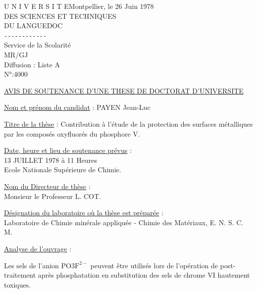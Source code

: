 
\noindent U N I V E R S I T E\hfill Montpellier, le 26 Juin 1978\\
DES SCIENCES ET TECHNIQUES\\
DU LANGUEDOC\\
\texttt{-{}-{}-{}-{}-{}-{}-{}-{}-{}-{}-{}-}\\
Service de la Scolarité\\
MR/GJ\\
Diffusion : Liste A\\
N°:4000

\uline{AVIS DE SOUTENANCE D'UNE THESE DE DOCTORAT D'UNIVERSITE}

\uline{Nom et prénom du candidat} : PAYEN Jean-Luc

\uline{Titre de la thèse} : Contribution à l'étude de la protection des surfaces métalliques par les composés oxyfluorés du phosphore V.

\uline{Date, heure et lieu de soutenance prévus} :\\
13 JUILLET 1978 à 11 Heures\\
Ecole Nationale Supérieure de Chimie.

\uline{Nom du Directeur de thèse} :\\
Monsieur le Professeur L. COT.

\uline{Désignation du laboratoire où la thèse est préparée} :\\
Laboratoire de Chimie minérale appliquée - Chimie des Matériaux, \quad E. N. S. C. M.

\uline{Analyse de l'ouvrage} :

Les sels de l'anion $\mathrm{PO3F}^{2-}$ peuvent être utilisés lors de l'opération de post-traitement après phosphatation en substitution des sels de chrome VI hautement toxiques.

